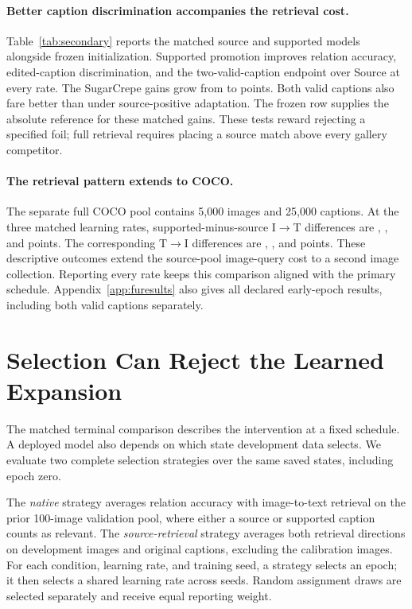 \documentclass[11pt]{article}
\begin{document}

\paragraph{Better caption discrimination accompanies the retrieval cost.}
Table~\ref{tab:secondary} reports the matched source and supported models alongside frozen initialization. Supported promotion improves relation accuracy, edited-caption discrimination, and the two-valid-caption endpoint over Source at every rate. The SugarCrepe gains grow from \FuSugarGainOne{} to \FuSugarGainThree{} points. Both valid captions also fare better than under source-positive adaptation. The frozen row supplies the absolute reference for these matched gains. These tests reward rejecting a specified foil; full retrieval requires placing a source match above every gallery competitor.

\paragraph{The retrieval pattern extends to COCO.}
The separate full COCO pool contains 5,000 images and 25,000 captions. At the three matched learning rates, supported-minus-source I$\to$T differences are \FuCocoImageDifferenceOne{}, \FuCocoImageDifferenceTwo{}, and \FuCocoImageDifferenceThree{} points. The corresponding T$\to$I differences are \FuCocoTextDifferenceOne{}, \FuCocoTextDifferenceTwo{}, and \FuCocoTextDifferenceThree{} points. These descriptive outcomes extend the source-pool image-query cost to a second image collection. Reporting every rate keeps this comparison aligned with the primary schedule. Appendix~\ref{app:furesults} also gives all declared early-epoch results, including both valid captions separately.

\section{Selection Can Reject the Learned Expansion}
\label{sec:selection}
The matched terminal comparison describes the intervention at a fixed schedule. A deployed model also depends on which state development data selects. We evaluate two complete selection strategies over the same saved states, including epoch zero.

The \emph{native} strategy averages relation accuracy with image-to-text retrieval on the prior 100-image validation pool, where either a source or supported caption counts as relevant. The \emph{source-retrieval} strategy averages both retrieval directions on \FuDevImages{} development images and \FuDevCaptions{} original captions, excluding the calibration images. For each condition, learning rate, and training seed, a strategy selects an epoch; it then selects a shared learning rate across seeds. Random assignment draws are selected separately and receive equal reporting weight.
\end{document}
